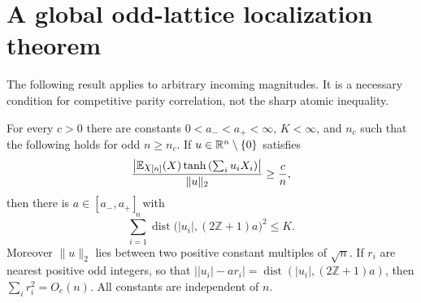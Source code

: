 \section{A global odd-lattice localization theorem}
\label{app:odd-lattice-localization}

The following result applies to arbitrary incoming magnitudes. It is a
necessary condition for competitive parity correlation, not the sharp
atomic inequality.

\begin{theorem}
\label{thm:odd-lattice-localization}
For every $c>0$ there are constants $0<a_-<a_+<\infty$, $K<\infty$,
and $n_c$ such that the following holds for odd $n\ge n_c$.
If $u\in\mathbb R^n\setminus\{0\}$ satisfies
\[
 \frac{\left|\mathbb E\chi_{[n]}(X)\tanh\left(\sum_i u_iX_i\right)\right|}
      {\|u\|_2}\ge\frac cn,
\]
then there is $a\in[a_-,a_+]$ with
\[
 \sum_{i=1}^n\operatorname{dist}\bigl(|u_i|,(2\mathbb Z+1)a\bigr)^2
 \le K.
\]
Moreover $\|u\|_2$ lies between two positive constant multiples of
$\sqrt n$. If $r_i$ are nearest positive odd integers, so that
$\bigl||u_i|-ar_i\bigr|=\operatorname{dist}(|u_i|,(2\mathbb Z+1)a)$,
then $\sum_i r_i^2=O_c(n)$. All constants are independent of $n$.
\end{theorem}

